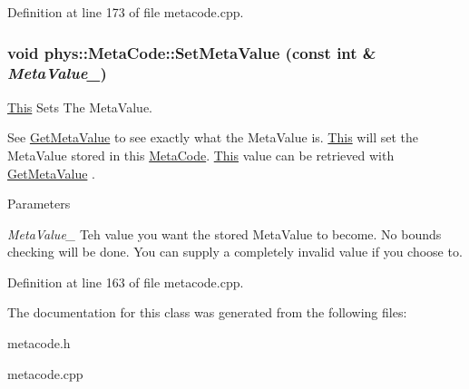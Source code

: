 Definition at line 173 of file metacode.cpp.

\hypertarget{classphys_1_1MetaCode_a31a6390626b08c1bbf08e3f68d2ea764}{
\subsubsection[{SetMetaValue}]{\setlength{\rightskip}{0pt plus 5cm}void phys::MetaCode::SetMetaValue (const int \& {\em MetaValue\_\-})}}
\label{da/dc9/classphys_1_1MetaCode_a31a6390626b08c1bbf08e3f68d2ea764}


\hyperlink{structThis}{This} Sets The MetaValue. 

See \hyperlink{classphys_1_1MetaCode_ad8e7e4e7c6cdc6a05b8522910ce90cd4}{GetMetaValue} to see exactly what the MetaValue is. \hyperlink{structThis}{This} will set the MetaValue stored in this \hyperlink{classphys_1_1MetaCode}{MetaCode}. \hyperlink{structThis}{This} value can be retrieved with \hyperlink{classphys_1_1MetaCode_ad8e7e4e7c6cdc6a05b8522910ce90cd4}{GetMetaValue} . 
\begin{DoxyParams}{Parameters}
\item[{\em MetaValue\_\-}]Teh value you want the stored MetaValue to become. No bounds checking will be done. You can supply a completely invalid value if you choose to. \end{DoxyParams}


Definition at line 163 of file metacode.cpp.



The documentation for this class was generated from the following files:\begin{DoxyCompactItemize}
\item 
metacode.h\item 
metacode.cpp\end{DoxyCompactItemize}
